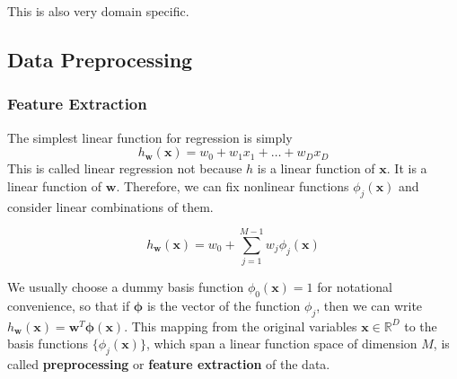 \documentclass{article}
\begin{document}
    This is also very domain specific. 

  \subsection{Data Preprocessing}

    \subsubsection{Feature Extraction}

      The simplest linear function for regression is simply 
      \[h_\mathbf{w} (\mathbf{x}) = w_0 + w_1 x_1 + \ldots + w_D x_D\]
      This is called linear regression not because $h$ is a linear function of $\mathbf{x}$. It is a linear function of $\mathbf{w}$. Therefore, we can fix nonlinear functions $\phi_j (\mathbf{x})$ and consider linear combinations of them. 

        \[h_\mathbf{w} (\mathbf{x}) = w_0 + \sum_{j=1}^{M-1} w_j \phi_j (\mathbf{x})\]

      We usually choose a dummy basis function $\phi_0 (\mathbf{x}) = 1$ for notational convenience, so that if $\boldsymbol{\phi}$ is the vector of the function $\phi_j$, then we can write $h_\mathbf{w} (\mathbf{x}) = \mathbf{w}^T \boldsymbol{\phi} (\mathbf{x})$. This mapping from the original variables $\mathbf{x} \in \mathbb{R}^D$ to the basis functions $\{\phi_j (\mathbf{x})\}$, which span a linear function space of dimension $M$, is called \textbf{preprocessing} or \textbf{feature extraction} of the data. 
\end{document}
